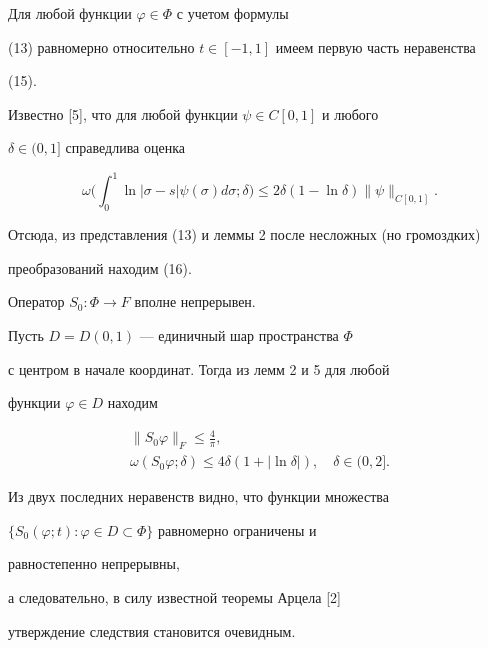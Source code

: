  


\begin{pf} 


Для любой функции $\varphi\in\Phi$ с учетом формулы 


(13) равномерно относительно $t\in[-1,1]$ имеем первую часть неравенства


(15).


 


Известно [5], что для любой функции $\psi\in C[0,1]$ и любого 


$\delta\in(0,1]$ справедлива оценка 


$$ 


\omega\bigg(\int^1_0\ln|\sigma-s|\psi(\sigma)d\sigma;\delta\bigg)\le 


2\delta(1-\ln\delta)\|\psi\|_{C[0,1]}. 


$$ 


Отсюда, из представления (13) и леммы 2 после несложных (но громоздких) 


преобразований находим (16). 


\end{pf} 


 


\begin{cornonum} 


Оператор $S_0:\Phi\to F$ вполне непрерывен. 


\end{cornonum} 


 


\begin{pf} 


Пусть $D=D(0,1)$ --- единичный шар пространства $\Phi$ 


с центром в начале координат. Тогда из лемм 2 и 5 для любой 


функции $\varphi\in D$ находим 


\begin{gather*} 


\|S_0\varphi\|_F\le\frac{4}{\pi}, \\ 


\omega(S_0\varphi;\delta)\le4\delta(1+|\ln\delta|),\quad 


\delta\in(0,2]. 


\end{gather*} 


Из двух последних неравенств видно, что функции множества 


$\{S_0(\varphi;t):\varphi\in D\subset\Phi\}$ равномерно ограничены и 


равностепенно непрерывны, 


а следовательно, в силу известной теоремы Арцела [2] 


утверждение следствия становится очевидным. 


\end{pf} 


